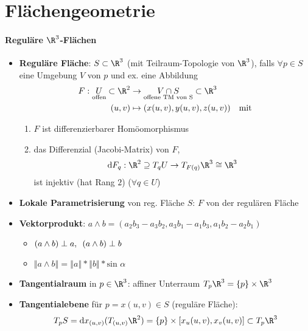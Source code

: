 \section{Flächengeometrie}

\paragraph{Reguläre \( \R^3 \)-Flächen}
\begin{itemize}
  \item \textbf{Reguläre Fläche}: \( S \subset \R^3 \) (mit Teilraum-Topologie von \( \R^3 \)), falls \( \forall p \in S \) eine Umgebung \( V \) von \( p \) und ex. eine Abbildung
  \begin{align*}
    F : \underset{\text{offen}}{U} \subset \R^2 &\to \underset{\text{offene TM von S}}{V \cap S} \subset \R^3 \\
    (u,v) &\mapsto (x(u,v),y(u,v),z(u,v)) \quad \text{mit}
  \end{align*}
  \begin{enumerate}
    \item \( F \) ist differenzierbarer Homöomorphismus
    \item das Differenzial (Jacobi-Matrix) von \( F \),
    \begin{equation*}
      \text{d}F_q : \R^2 \supseteq T_q U \to T_{F(q)}\R^3 \cong \R^3
    \end{equation*}
    ist injektiv (hat Rang \( 2 \)) (\( \forall q \in U \))
  \end{enumerate}
  \item \textbf{Lokale Parametrisierung} von reg. Fläche \( S \): \( F \) von der regulären Fläche
  \item \textbf{Vektorprodukt}: \( a \wedge b = (a_2b_3 - a_3b_2, a_3b_1-a_1b_3,a_1b_2-a_2b_1) \)
  \begin{itemize}
    \item \( (a \wedge b) \perp a, \enskip (a \wedge b) \perp b \)
    \item \( \left\Vert a \wedge b \right\Vert = \left\Vert a \right\Vert * \left\Vert b \right\Vert * \text{sin }\alpha \)
  \end{itemize}
  \item \textbf{Tangentialraum} in \( p \in \R^3 \): affiner Unterraum \( T_p\R^3 = \left \{ p \right \} \times \R^3 \)
  \item \textbf{Tangentialebene} für \( p = x(u,v) \in S \) (reguläre Fläche):
  \begin{equation*}
    T_p S = \text{d}x_{(u,v)}(T_{(u,v)}\R^2) = \left \{ p \right \} \times [x_u(u,v),x_v(u,v)] \subset T_p\R^3
  \end{equation*}
\end{itemize}

